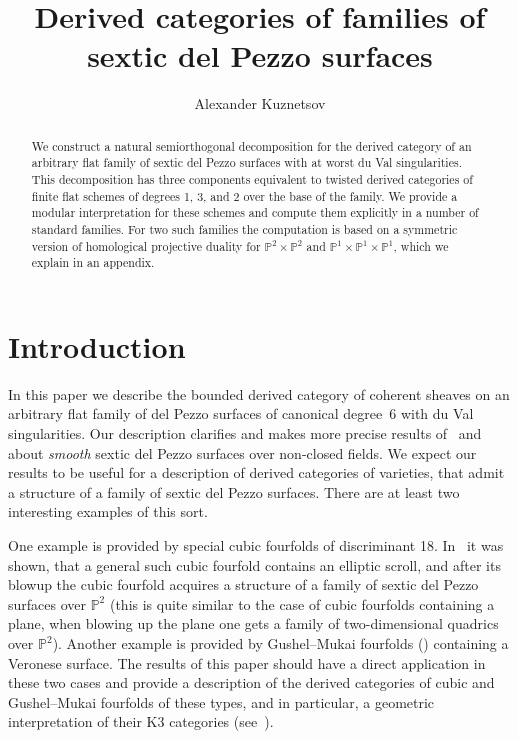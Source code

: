 \documentclass[11pt]{amsart}
\title{Derived categories of families of sextic del Pezzo surfaces}
\author{Alexander Kuznetsov}
\date{}
\renewcommand{\P}{{\mathbb{P}}}
\DeclareMathOperator{\Fl}{\mathrm{Fl}}
\theoremstyle{plain}
\theoremstyle{definition}
\theoremstyle{remark}
\begin{document}
\begin{abstract}
We construct a natural semiorthogonal decomposition for the derived category of an arbitrary flat family of sextic del Pezzo surfaces with at worst du Val singularities.
This decomposition has three components equivalent to twisted derived categories of finite flat schemes of degrees 1, 3, and 2 over the base of the family.
We provide a modular interpretation for these schemes and compute them explicitly in a number of standard families.
For two such families the computation is based on a symmetric version of homological projective duality 
for $\P^2 \times \P^2$ and $\P^1 \times \P^1 \times \P^1$, which we explain in an appendix.
\end{abstract}

\maketitle



\section{Introduction}

In this paper we describe the bounded derived category of coherent sheaves on an arbitrary flat family 
of del Pezzo surfaces of canonical degree~6 with du Val singularities.
Our description  clarifies and makes more precise results of~\cite{blunk2011derived} and~\cite{auel2015semiorthogonal}
about \emph{smooth} sextic del Pezzo surfaces over non-closed fields.
We expect our results to be useful for a description of derived categories of varieties, 
that admit a structure of a family of sextic del Pezzo surfaces.
There are at least two interesting examples of this sort.

One example is provided by special cubic fourfolds of discriminant 18. 
In~\cite{addington2016cubic} it was shown, that a general such cubic fourfold contains an elliptic scroll, 
and after its blowup the cubic fourfold acquires a structure of a family of sextic del Pezzo surfaces over $\P^2$
(this is quite similar to the case of cubic fourfolds containing a plane, when blowing up the plane one gets a family of two-dimensional quadrics over $\P^2$).
Another example is provided by Gushel--Mukai fourfolds (\cite{debarre-kuznetsov, kuznetsov-perry}) containing a Veronese surface.
The results of this paper should have a direct application in these two cases and provide a description of the derived categories of cubic and Gushel--Mukai fourfolds of these types,
and in particular, a geometric interpretation of their K3 categories (see~\cite{kuznetsov2010cubic,kuznetsov2016perry}).
\end{document}
